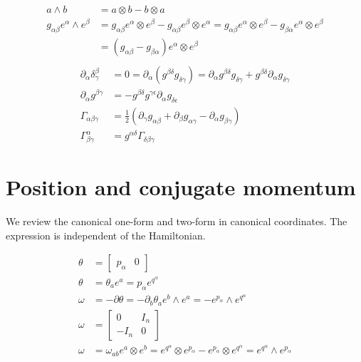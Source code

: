 \documentclass[11pt]{article}
\begin{document}
\begin{equation}
\begin{aligned}
a \wedge b &= a \otimes b - b \otimes a \\
g_{\alpha\beta} e^\alpha \wedge e^\beta &= g_{\alpha\beta} e^\alpha \otimes e^\beta - g_{\alpha\beta} e^\beta \otimes e^\alpha = g_{\alpha\beta} e^\alpha \otimes e^\beta - g_{\beta\alpha} e^\alpha \otimes e^\beta \\
&= (g_{\alpha\beta} - g_{\beta\alpha}) e^\alpha \otimes e^\beta \\
\end{aligned}
\end{equation}
\begin{equation}
\begin{aligned}
\partial_\alpha \delta^\beta_\gamma &= 0 = \partial_\alpha ( g^{\beta \delta} g_{\delta \gamma} ) = \partial_\alpha g^{\beta \delta} g_{\delta \gamma} + g^{\beta \delta} \partial_\alpha g_{\delta \gamma} \\
\partial_\alpha g^{\beta \gamma} &= - g^{\beta \delta} g^{\gamma \epsilon} \partial_\alpha g_{\delta \epsilon} \\
\Gamma_{\alpha \beta \gamma} &= \frac{1}{2} (\partial_\gamma g_{\alpha\beta} + \partial_\beta g_{\alpha\gamma} - \partial_\alpha g_{\beta\gamma}) \\
\Gamma^\alpha_{\beta\gamma} &= g^{\alpha \delta} \Gamma_{\delta\beta\gamma}
\end{aligned}
\end{equation}

\section{Position and conjugate momentum}

We review the canonical one-form and two-form in canonical coordinates. The expression is independent of the Hamiltonian.

\begin{equation}
\begin{aligned}
\theta &= \left[ \begin{matrix}
p_\alpha & 0 \end{matrix} \right] \\
\theta &= \theta_a e^a = p_\alpha e^{q^\alpha} \\
\omega &= - \partial \theta = - \partial_b \theta_a e^b \wedge e^a = - e^{p_\alpha} \wedge e^{q^\alpha}  \\
\omega &= \left[ \begin{matrix}
0 & I_n \\[2.2ex]
- I_n & 0 \end{matrix} \right] \\
\omega &= \omega_{ab} e^a \otimes e^b = e^{q^\alpha} \otimes e^{p_\alpha} - e^{p_\alpha} \otimes e^{q^\alpha} = e^{q^\alpha} \wedge e^{p_\alpha} \\
\end{aligned}
\end{equation}
\end{document}
